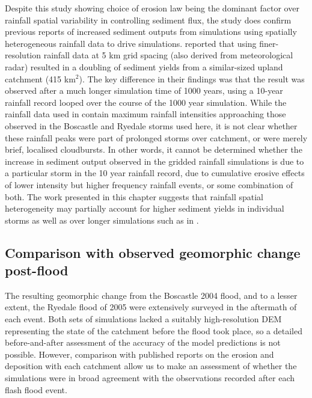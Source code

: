 Despite this study showing choice of erosion law being the dominant factor over rainfall spatial variability in controlling sediment flux, the study does confirm previous reports of increased sediment outputs from simulations using spatially heterogeneous rainfall data to drive simulations. \citet{coulthard2016sensitivity} reported that using finer-resolution rainfall data at 5 km grid spacing (also derived from meteorological radar) resulted in a doubling of sediment yields from a similar-sized upland catchment (415 km\(^2\)). The key difference in their findings was that the result was observed after a much longer simulation time of 1000 years, using a 10-year rainfall record looped over the course of the 1000 year simulation. While the rainfall data used in \citet{coulthard2016sensitivity} contain maximum rainfall intensities approaching those observed in the Boscastle and Ryedale storms used here, it is not clear whether these rainfall peaks were part of prolonged storms over catchment, or were merely brief, localised cloudbursts. In other words, it cannot be determined whether the increase in sediment output observed in the \citet{coulthard2016sensitivity} gridded rainfall simulations is due to a particular storm in the 10 year rainfall record, due to cumulative erosive effects of lower intensity but higher frequency rainfall events, or some combination of both. The work presented in this chapter suggests that rainfall spatial heterogeneity may partially account for higher sediment yields in individual storms as well as over longer simulations such as in \citet{coulthard2016sensitivity}.

\subsection{Comparison with observed geomorphic change post-flood}

The resulting geomorphic change from the Boscastle 2004 flood, and to a lesser extent, the Ryedale flood of 2005 were extensively surveyed in the aftermath of each event. Both sets of simulations lacked a suitably high-resolution DEM representing the state of the catchment before the flood took place, so a detailed before-and-after assessment of the accuracy of the model predictions is not possible. However, comparison with published reports on the erosion and deposition with each catchment allow us to make an assessment of whether the simulations were in broad agreement with the observations recorded after each flash flood event.

